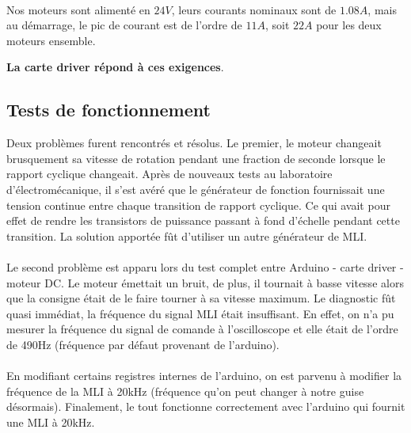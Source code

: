 \paragraph{}
Nos moteurs sont alimenté en $24V$, leurs courants nominaux sont de $1.08A$, mais au démarrage, le pic de courant est de l'ordre de $11A$, soit $22A$ pour les deux moteurs ensemble.

\textbf{La carte driver répond à ces exigences}.

\subsection{Tests de fonctionnement}
Deux problèmes furent rencontrés et résolus. Le premier, le moteur changeait brusquement sa vitesse de rotation pendant une fraction de seconde lorsque le rapport cyclique changeait. Après de nouveaux tests au laboratoire d'électromécanique, il s'est avéré que le générateur de fonction fournissait une tension continue entre chaque transition de rapport cyclique. Ce qui avait pour effet de rendre les transistors de puissance passant à fond d'échelle pendant cette transition.
\noindent La solution apportée fût d'utiliser un autre générateur de MLI.

\paragraph{}
Le second problème est apparu lors du test complet entre Arduino - carte driver - moteur DC. Le moteur émettait un bruit, de plus, il tournait à basse vitesse alors que la consigne était de le faire tourner à sa vitesse maximum. Le diagnostic fût quasi immédiat, la fréquence du signal MLI était insuffisant. En effet, on n'a pu mesurer la fréquence du signal de comande à l'oscilloscope et elle était de l'ordre de 490Hz (fréquence par défaut provenant de l'arduino).

\paragraph{}
En modifiant certains registres internes de l'arduino, on est parvenu à modifier la fréquence de la MLI à 20kHz (fréquence qu'on peut changer à notre guise désormais). Finalement, le tout fonctionne correctement avec l'arduino qui fournit une MLI à 20kHz.